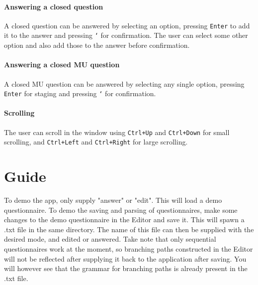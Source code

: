 \documentclass[11pt,a4paper]{article}
\begin{document}
\paragraph{Answering a closed question}
A closed question can be answered by selecting an option, pressing \texttt{Enter} to add it to the answer and pressing \texttt{`} for confirmation. The user can select some other option and also add those to the answer before confirmation.

\paragraph{Answering a closed MU question}
A closed MU question can be answered by selecting any single option, pressing \texttt{Enter} for staging and pressing \texttt{`} for confirmation.

\paragraph{Scrolling}
The user can scroll in the window using \texttt{Ctrl+Up} and \texttt{Ctrl+Down} for small scrolling, and \texttt{Ctrl+Left} and \texttt{Ctrl+Right} for large scrolling.

\section{Guide}
To demo the app, only supply "answer" or "edit". This will load a demo questionnaire. To demo the saving and parsing of questionnaires, make some changes to the demo questionnaire in the Editor and save it. This will spawn a .txt file in the same directory. The name of this file can then be supplied with the desired mode, and edited or answered. Take note that only sequential questionnaires work at the moment, so branching paths constructed in the Editor will not be reflected after supplying it back to the application after saving. You will however see that the grammar for branching paths is already present in the .txt file.

\end{document}
